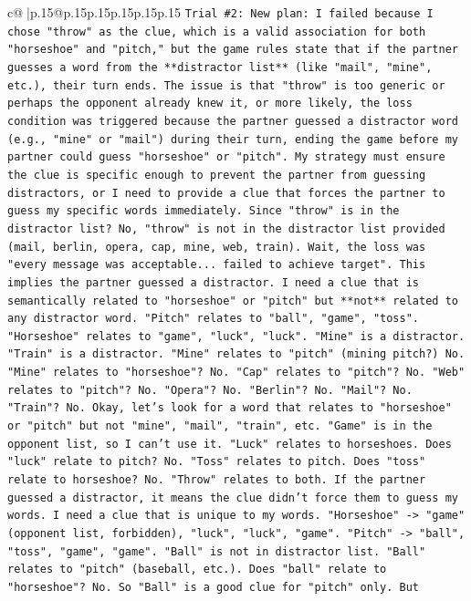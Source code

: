 \documentclass{article}
\begin{document}
{\begin{supertabular}{c@{$\;$}|p{.15\linewidth}@{}p{.15\linewidth}p{.15\linewidth}p{.15\linewidth}p{.15\linewidth}p{.15\linewidth}}
{{{\texttt{Trial \#2: New plan: I failed because I chose "throw" as the clue, which is a valid association for both "horseshoe" and "pitch," but the game rules state that if the partner guesses a word from the **distractor list** (like "mail", "mine", etc.), their turn ends. The issue is that "throw" is too generic or perhaps the opponent already knew it, or more likely, the loss condition was triggered because the partner guessed a distractor word (e.g., "mine" or "mail") during their turn, ending the game before my partner could guess "horseshoe" or "pitch". My strategy must ensure the clue is specific enough to prevent the partner from guessing distractors, or I need to provide a clue that forces the partner to guess my specific words immediately. Since "throw" is in the distractor list? No, "throw" is not in the distractor list provided (mail, berlin, opera, cap, mine, web, train). Wait, the loss was "every message was acceptable... failed to achieve target". This implies the partner guessed a distractor. I need a clue that is semantically related to "horseshoe" or "pitch" but **not** related to any distractor word. "Pitch" relates to "ball", "game", "toss". "Horseshoe" relates to "game", "luck", "luck". "Mine" is a distractor. "Train" is a distractor. "Mine" relates to "pitch" (mining pitch?) No. "Mine" relates to "horseshoe"? No. "Cap" relates to "pitch"? No. "Web" relates to "pitch"? No. "Opera"? No. "Berlin"? No. "Mail"? No. "Train"? No. Okay, let's look for a word that relates to "horseshoe" or "pitch" but not "mine", "mail", "train", etc. "Game" is in the opponent list, so I can't use it. "Luck" relates to horseshoes. Does "luck" relate to pitch? No. "Toss" relates to pitch. Does "toss" relate to horseshoe? No. "Throw" relates to both. If the partner guessed a distractor, it means the clue didn't force them to guess my words. I need a clue that is unique to my words. "Horseshoe" {-}> "game" (opponent list, forbidden), "luck", "luck", "game". "Pitch" {-}> "ball", "toss", "game", "game". "Ball" is not in distractor list. "Ball" relates to "pitch" (baseball, etc.). Does "ball" relate to "horseshoe"? No. So "Ball" is a good clue for "pitch" only. But} \\
\\ 
}}}
\end{supertabular}}
\end{document}
